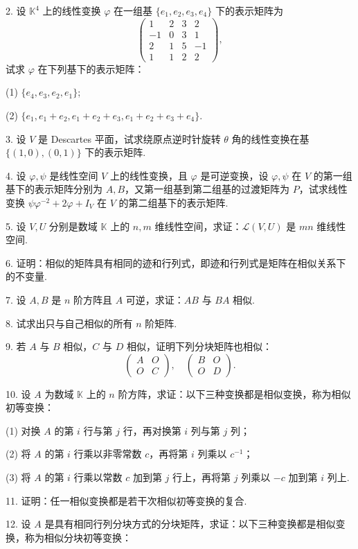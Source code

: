 \documentclass[UTF8, 12pt, fontset=fandol, oneside]{ctexart}
\begin{document}
2. 设 $\mathbb{K}^4$ 上的线性变换 $\varphi$ 在一组基 $\{e_1,e_2,e_3,e_4\}$ 下的表示矩阵为
\[
\left(\begin{array}{rrrr}
1 & 2 & 3 & 2\\
-1 & 0 & 3 & 1\\
2 & 1 & 5 & -1\\
1 & 1 & 2 & 2
\end{array}\right),
\]
试求 $\varphi$ 在下列基下的表示矩阵：

(1) $\{e_4,e_3,e_2,e_1\}$;

(2) $\{e_1,e_1+e_2,e_1+e_2+e_3,e_1+e_2+e_3+e_4\}$.

3. 设 $V$ 是 Descartes 平面，试求绕原点逆时针旋转 $\theta$ 角的线性变换在基 $\{(1,0),(0,1)\}$ 下的表示矩阵.

4. 设 $\varphi,\psi$ 是线性空间 $V$ 上的线性变换，且 $\varphi$ 是可逆变换，设 $\varphi,\psi$ 在 $V$ 的第一组基下的表示矩阵分别为 $A,B$，又第一组基到第二组基的过渡矩阵为 $P$，试求线性变换 $\psi\varphi^{-2}+2\varphi+I_V$ 在 $V$ 的第二组基下的表示矩阵.

5. 设 $V,U$ 分别是数域 $\mathbb{K}$ 上的 $n,m$ 维线性空间，求证：$\mathcal{L}(V,U)$ 是 $mn$ 维线性空间.

6. 证明：相似的矩阵具有相同的迹和行列式，即迹和行列式是矩阵在相似关系下的不变量.

7. 设 $A,B$ 是 $n$ 阶方阵且 $A$ 可逆，求证：$AB$ 与 $BA$ 相似.

8. 试求出只与自己相似的所有 $n$ 阶矩阵.

9. 若 $A$ 与 $B$ 相似，$C$ 与 $D$ 相似，证明下列分块矩阵也相似：
\[
\left(\begin{array}{cc}
A & O\\
O & C
\end{array}\right),\quad
\left(\begin{array}{cc}
B & O\\
O & D
\end{array}\right).
\]

10. 设 $A$ 为数域 $\mathbb{K}$ 上的 $n$ 阶方阵，求证：以下三种变换都是相似变换，称为相似初等变换：

(1) 对换 $A$ 的第 $i$ 行与第 $j$ 行，再对换第 $i$ 列与第 $j$ 列；

(2) 将 $A$ 的第 $i$ 行乘以非零常数 $c$，再将第 $i$ 列乘以 $c^{-1}$；

(3) 将 $A$ 的第 $i$ 行乘以常数 $c$ 加到第 $j$ 行上，再将第 $j$ 列乘以 $-c$ 加到第 $i$ 列上.

11. 证明：任一相似变换都是若干次相似初等变换的复合.

12. 设 $A$ 是具有相同行列分块方式的分块矩阵，求证：以下三种变换都是相似变换，称为相似分块初等变换：
\end{document}
